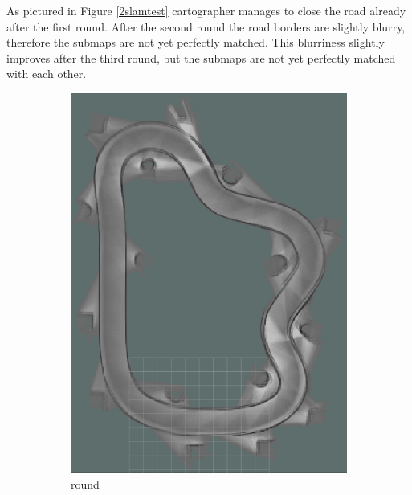 As pictured in Figure \ref{2slamtest} cartographer manages to close the road already after the first round. After the second round the road borders are slightly blurry, therefore the submaps are not yet perfectly matched. This blurriness slightly improves after the third round, but the submaps are not yet perfectly matched with each other.

\begin{figure}[H]
	\centering
	\begin{subfigure}{.3\linewidth}
		\includegraphics[width=\textwidth]{Pictures/2slamtest1}
		\caption{ round}
		\end{subfigure}	
	\begin{subfigure}{.3\linewidth}

\end{subfigure}
\end{figure}
